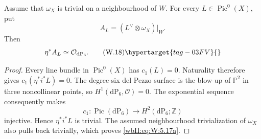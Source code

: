 \begin{proposition}
\hypertarget{tag-03IO}{}\label{wbII:prop:pic0-pullback}

Assume that $\omega_X$ is trivial on a neighbourhood of $W$.
For every $L\in\operatorname{Pic}^0(X)$, put
\[
 A_L=(L^\vee\otimes\omega_X)|_W.
\]
Then
\[
 \eta^*A_L\simeq\mathcal O_{\mathrm{dP}_6}.
\tag{W.18}\hypertarget{tag-03FV}{}\label{wbII:eq:W:5.17a}
\]
\end{proposition}



\begin{proof}
Every line bundle in $\operatorname{Pic}^0(X)$ has $c_1(L)=0$.  Naturality
therefore gives $c_1(\eta^*i^*L)=0$.  The degree-six del Pezzo surface is the
blow-up of $\mathbb P^2$ in three noncollinear points, so
$H^1(\mathrm{dP}_6,\mathcal O)=0$.  The exponential sequence consequently
makes
\[
 c_1:\operatorname{Pic}(\mathrm{dP}_6)\longrightarrow
 H^2(\mathrm{dP}_6;\mathbb Z)
\]
injective.  Hence $\eta^*i^*L$ is trivial.  The assumed neighbourhood
trivialization of $\omega_X$ also pulls back trivially, which proves
\eqref{wbII:eq:W:5.17a}.

\end{proof}